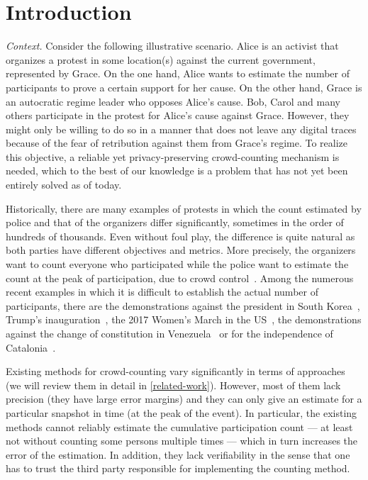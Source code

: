 \section{Introduction}%
\label{Introduction}

\emph{Context.} 
Consider the following illustrative scenario.
Alice is an activist that organizes a protest in some location(s) against the current government, represented by Grace.
On the one hand, Alice wants to estimate the number of participants to prove a certain support for her cause.
On the other hand, Grace is an autocratic regime leader who opposes Alice's cause.
Bob, Carol and many others participate in the protest for Alice's cause against Grace.
However, they might only be willing to do so in a manner that does not leave any digital traces because of the fear of retribution against them from Grace's regime. 
To realize this objective, a reliable yet privacy-preserving crowd-counting mechanism is needed, which to the best of our knowledge is a problem that has not yet been entirely solved as of today.

Historically, there are many examples of protests in which the count estimated by police and that of the organizers differ significantly, sometimes in the order of hundreds of thousands.
Even without foul play, the difference is quite natural as both parties have different objectives and metrics.
More precisely, the organizers want to count everyone who participated while the police want to estimate the count at the peak of participation, due to crowd control~\cite{2016DemonstrationsInSeoul}.
Among the numerous recent examples in which it is difficult to establish the actual number of participants, there are the demonstrations against the president in South Korea~\cite{2016DemonstrationsInSeoul}, Trump's inauguration~\cite{HowWillWeKnowTrumpInauguralCrowdSize}, the 2017 Women's March in the US~\cite{2017WomensMarchesInUS}, the demonstrations against the change of constitution in Venezuela~\cite{AlJazeeraOnVenezuela2017} or for the independence of Catalonia~\cite{CataloniaDemonstrations}.

Existing methods for crowd-counting vary significantly in terms of approaches (we will review them in detail in \cref{related-work}).
However, most of them lack precision (\ie they have large error margins) and 
they can only give an estimate for a particular snapshot in time (\eg at the 
peak of the event). In particular, the existing methods cannot reliably 
estimate the cumulative participation count --- at least not without counting 
some persons multiple times --- which in turn increases the error of the 
estimation.
In addition, they lack verifiability in the sense that one has to trust the third party responsible for implementing the counting method. 

